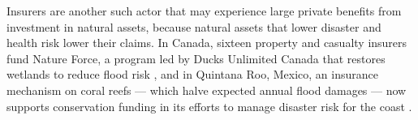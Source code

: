 \documentclass[12pt]{article}
\begin{document}
Insurers are another such actor that may experience large private benefits from investment in natural assets, because natural assets that lower disaster and health risk lower their claims. In Canada, sixteen property and casualty insurers fund Nature Force, a program led by Ducks Unlimited Canada that restores wetlands to reduce flood risk \citep{kouskyNatureInsuranceInsurance2025}, and in Quintana Roo, Mexico, an insurance mechanism on coral reefs --- which halve expected annual flood damages \citep{beckGlobalFloodProtection2018} --- now supports conservation funding in its efforts to manage disaster risk for the coast \citep{schelskeInsuringNaturalEcosystems2021}. 



\end{document}
